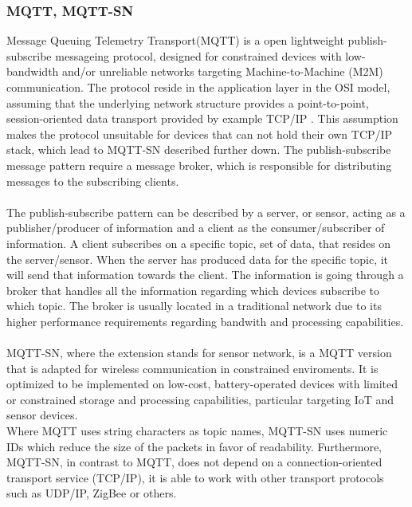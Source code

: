 \subsubsection{MQTT, MQTT-SN}
Message Queuing Telemetry Transport(MQTT) is a open lightweight publish-subscribe messageing protocol, designed for constrained devices with low-bandwidth and/or unreliable networks targeting Machine-to-Machine (M2M) communication\cite{mqtt}. The protocol reside in the application layer in the OSI model, assuming that the underlying network structure provides a point-to-point, session-oriented data transport provided by example TCP/IP \cite{hunkeler2008mqtt}. This assumption makes the protocol unsuitable for devices that can not hold their own TCP/IP stack, which lead to MQTT-SN described further down. The publish-subscribe message pattern require a message broker, which is responsible for distributing messages to the subscribing clients.
\\\\
The publish-subscribe pattern can be described by a server, or sensor, acting as a publisher/producer of information and a client as the consumer/subscriber of information. A client subscribes on a specific topic, set of data, that resides on the server/sensor. When the server has produced data for the specific topic, it will send that information towards the client. 
The information is going through a broker that handles all the information regarding which devices subscribe to which topic. The broker is usually located in a traditional network due to its higher performance requirements regarding bandwith and processing capabilities.\\\\
MQTT-SN, where the extension stands for sensor network, is a MQTT version that is adapted for wireless communication in constrained enviroments. It is optimized to be implemented on low-cost, battery-operated devices with limited or constrained storage and processing capabilities\cite{MQTT-SN}, particular targeting IoT and sensor devices.\\
Where MQTT uses string characters as topic names, MQTT-SN uses numeric IDs which reduce the size of the packets in favor of readability. Furthermore, MQTT-SN, in contrast to MQTT, does not depend on a connection-oriented transport service (TCP/IP), it is able to work with other transport protocols such as UDP/IP, ZigBee or others. 


